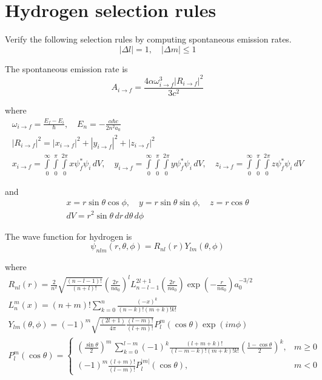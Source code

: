

\section*{Hydrogen selection rules}

Verify the following selection rules by computing spontaneous emission rates.
\begin{equation*}
|\Delta l|=1,\quad|\Delta m|\le1
\end{equation*}

The spontaneous emission rate is
\begin{equation*}
A_{i\rightarrow f}=\frac{4\alpha\omega_{i\rightarrow f}^3|R_{i\rightarrow f}|^2}{3c^2}
\end{equation*}

where
\begin{gather*}
\omega_{i\rightarrow f}=\frac{E_f-E_i}{\hbar},\quad E_n=-\frac{\alpha\hbar c}{2n^2a_0}
\\[1ex]
|R_{i\rightarrow f}|^2=|x_{i\rightarrow f}|^2+|y_{i\rightarrow f}|^2+|z_{i\rightarrow f}|^2
\\[1ex]
x_{i\rightarrow f}=\int\limits_{0}^{\infty}\int\limits_{0}^{\pi}\int\limits_{0}^{2\pi}x\psi_f^*\psi_i\,dV,
\quad
y_{i\rightarrow f}=\int\limits_{0}^{\infty}\int\limits_{0}^{\pi}\int\limits_{0}^{2\pi}y\psi_f^*\psi_i\,dV,
\quad
z_{i\rightarrow f}=\int\limits_{0}^{\infty}\int\limits_{0}^{\pi}\int\limits_{0}^{2\pi}z\psi_f^*\psi_i\,dV
\end{gather*}

and
\begin{gather*}
x=r\sin\theta\cos\phi,
\quad
y=r\sin\theta\sin\phi,
\quad
z=r\cos\theta
\\[1ex]
dV=r^2\sin\theta\,dr\,d\theta\,d\phi
\end{gather*}

The wave function for hydrogen is
\begin{equation*}
\psi_{nlm}(r,\theta,\phi)=R_{nl}(r)Y_{lm}(\theta,\phi)
\end{equation*}

where
\begin{gather*}
R_{nl}(r)=
\frac{2}{n^2}
\sqrt{\frac{(n-l-1)!}{(n+l)!}}
\left(\frac{2r}{na_0}\right)^l
L_{n-l-1}^{2l+1}\left(\frac{2r}{na_0}\right)
\exp\left(-\frac{r}{na_0}\right)
a_0^{-3/2}
\\[1ex]
L_n^m(x)=(n+m)!\sum_{k=0}^n\frac{(-x)^k}{(n-k)!(m+k)!k!}
\\[1ex]
Y_{lm}(\theta,\phi)=(-1)^m
\sqrt{\frac{(2l+1)}{4\pi}
\frac{(l-m)!}{(l+m)!}}
P_l^m(\cos\theta)\exp(im\phi)
\\[1ex]
P_l^m(\cos\theta)=\begin{cases}
\displaystyle
\left(\frac{\sin\theta}{2}\right)^m\,\sum_{k=0}^{l-m}
(-1)^k\frac{(l+m+k)!}{(l-m-k)!(m+k)!k!}
\left(\frac{1-\cos\theta}{2}\right)^k, & m\ge0
\\[3ex]
\displaystyle
(-1)^m\frac{(l+m)!}{(l-m)!}P_l^{|m|}(\cos\theta), & m<0
\end{cases}
\end{gather*}


